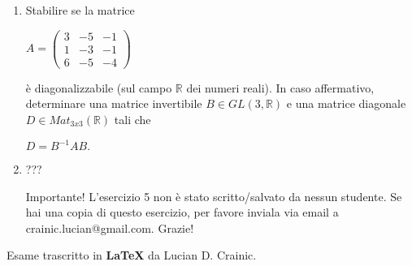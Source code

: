 \documentclass[fleqn]{article}
\begin{document}
\begin{enumerate}
   \item Stabilire se la matrice 
   \begin{center}
    $
    A = \begin{pmatrix}
       3 & -5 & -1 \\
       1 & -3 & -1 \\
       6 & -5 & -4
    \end{pmatrix}
    $
    \end{center}
   è diagonalizzabile (sul campo $\mathbb{R}$ dei numeri reali). In caso affermativo, determinare una matrice invertibile
   $B \in GL(3,\mathbb{R})$ e una matrice diagonale $D \in Mat_{3x3}(\mathbb{R})$ tali che  
   \begin{center}
      $D= B^{-1}AB.$
   \end{center}
   
   \item ??? 
   \begin{bclogo}[logo=\bcattention, couleurBarre=red, noborder=true, 
               couleur=LightSalmon]{Importante!}
    L'esercizio 5 non è stato scritto/salvato da nessun studente. 
    Se hai una copia di questo esercizio, per favore inviala via email a crainic.lucian@gmail.com. Grazie!
\end{bclogo}
\end{enumerate}
Esame trascritto in \textbf{\LaTeX} da Lucian D. Crainic.
\end{document}
